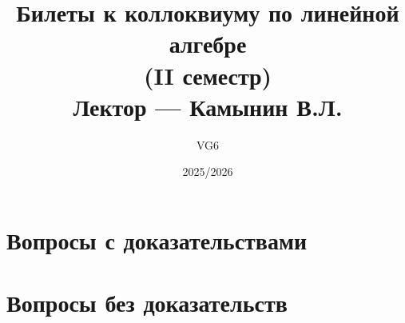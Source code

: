 \documentclass[12pt, a4paper]{article}
\title{Билеты к коллоквиуму по линейной алгебре \\(II семестр) \\Лектор --- Камынин В.Л.}
\author{VG6}
\date{2025/2026}
\begin{document}
\maketitle
\tableofcontents
\newpage

\section{Вопросы с доказательствами}









































\section{Вопросы без доказательств}
\end{document}
